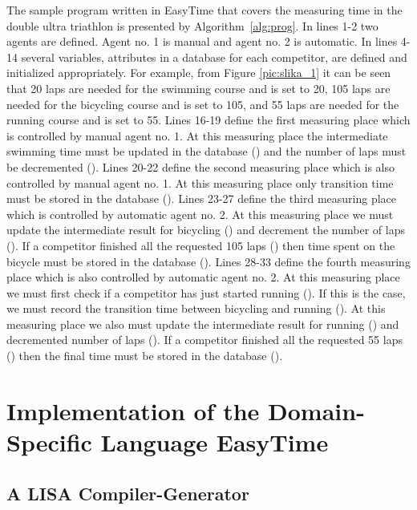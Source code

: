\documentclass[preprint, prX]{revtex4}
\begin{document}
The sample program written in EasyTime that covers the measuring time in the double ultra triathlon is presented by Algorithm~\ref{alg:prog}. In lines 1-2 two agents are defined. Agent no. 1 is manual and agent no. 2 is automatic. In lines 4-14 several variables, attributes in a database for each competitor, are defined and initialized appropriately. For example, from Figure \ref{pic:slika_1} it can be seen that 20 laps are needed for the swimming course and  is set to 20, 105 laps are needed for the bicycling course and  is set to 105, and 55 laps are needed for the running course and  is set to 55. Lines 16-19 define the first measuring place which is controlled by manual agent no. 1. At this measuring place the intermediate swimming time must be updated in the database () and the number of laps must be decremented (). Lines 20-22 define the second measuring place which is also controlled by manual agent no. 1. At this measuring place only transition time must be stored in the database (). Lines 23-27 define the third measuring place which is controlled by automatic agent no. 2. At this measuring place we must update the intermediate result for bicycling () and decrement the number of laps (). If a competitor finished all the requested 105 laps () then time spent on the bicycle must be stored in the database (). Lines 28-33 define the fourth measuring place which is also controlled by automatic agent no. 2. At this measuring place we must first check if a competitor has just started running (). If this is the case, we must record the transition time between bicycling and running (). At this measuring place we also must update the intermediate result for running () and decremented number of laps (). If a competitor finished all the requested 55 laps () then the final time must be stored in the database ().


\section{Implementation of the Domain-Specific Language EasyTime}

\subsection {A LISA Compiler-Generator}
\end{document}
